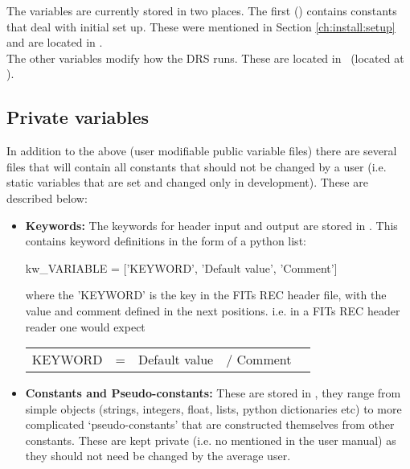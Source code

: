 The variables are currently stored in two places. The first (\configtxtfile) contains constants that deal with initial set up. These were mentioned in Section \ref{ch:install:setup} and are located in \configtxtfilepath. \\

\noindent The other variables modify how the DRS runs. These are located in \constantsfile\, (located at \constantsfilepath).  \\


\ifdevguide
\subsection{Private variables}

\noindent In addition to the above (user modifiable public variable files) there are several files that will contain all constants that should not be changed by a user (i.e. static variables that are set and changed only in development). These are described below:

\begin{itemize}

	\item \textbf{Keywords:} The keywords for header input and output are stored in \spirouKeywords. This contains keyword definitions in the form of a python list:  \\

	\begin{pythonbox}
	kw_VARIABLE = ['KEYWORD', 'Default value', 'Comment']
	\end{pythonbox}

	\noindent where the 'KEYWORD' is the key in the FITs REC header file, with the value and comment defined in the next positions. i.e. in a FITs REC header reader one would expect

	\begin{thighlight}
	\begin{tabular}{l c r c l}
	KEYWORD & = & Default value & / Comment \\
	\end{tabular}
	\end{thighlight}


	\item \textbf{Constants and Pseudo-constants:} These are stored in \spirouConst, they range from simple objects (strings, integers, float, lists, python dictionaries etc) to more complicated `pseudo-constants' that are constructed themselves from other constants. These are kept private (i.e. no mentioned in the user manual) as they should not need be changed by the average user.

\end{itemize}

